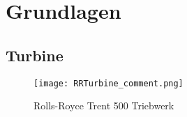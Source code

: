 \chapter{Grundlagen}
\section{Turbine}

\begin{figure}[htbp]
	\centering
	\texttt{[image: RRTurbine\_comment.png]}
	\caption{Rolls-Royce Trent 500 Triebwerk} \label{fig:RRTurbine}
\end{figure} 


